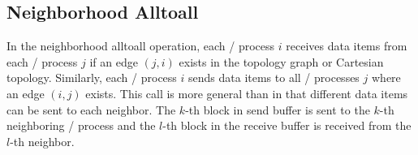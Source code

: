 \subsection{Neighborhood Alltoall}
\label{subsec:sparsecoll:alltoall}

In the neighborhood alltoall operation, each \MPI/ process $i$ receives data items from each \MPI/ process
$j$ if an edge $(j,i)$ exists in the topology graph or Cartesian
topology. Similarly, each \MPI/ process $i$ sends data items to all \MPI/ processes
$j$ where an edge $(i,j)$ exists. This call is more general than
 in that different data items can be
sent to each neighbor. The $k$-th block in send buffer is sent to the
$k$-th neighboring \MPI/ process and the $l$-th block in the receive buffer is
received from the $l$-th neighbor.

